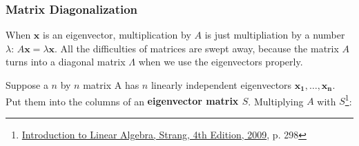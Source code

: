 \subsubsection{Matrix Diagonalization}

\begin{tcolorbox}[
    colbacktitle=red!10!white,
    colback=blue!10!white,coltitle=red!70!black,
    title=Why do we study disgonalizing a matrix?
]
    When $\boldsymbol{x}$ is an eigenvector, multiplication by $A$ is just multipliation by a number
    $\lambda$: $A\boldsymbol{x} = \lambda\boldsymbol{x}$. All the difficulties of matrices are swept away, because the
    matrix $A$ turns into a diagonal matrix $\Lambda$ when we use the eigenvectors properly.
\end{tcolorbox}

Suppose a $n$ by $n$ matrix A has $n$ linearly independent eigenvectors $\boldsymbol{x_1}, \ldots, \boldsymbol{x_n}$.
Put them into the columns of an \textbf{eigenvector matrix $S$}. Multiplying $A$ with $S$\footnote{\href{https://trello.com/c/qHJeDNkU}{Introduction to Linear Algebra, Strang, 4th Edition, 2009}, p. 298}:

